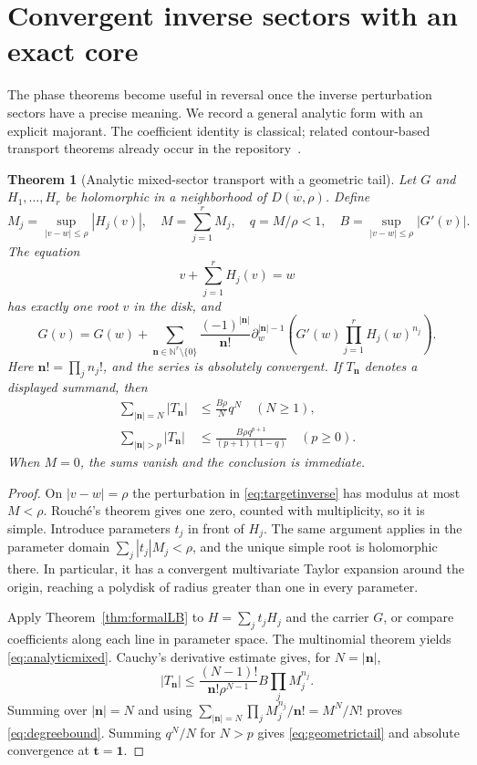 \documentclass[11pt,a4paper]{article}
\newtheorem{theorem}{Theorem}[section]
\theoremstyle{definition}
\theoremstyle{remark}
\newcommand{\N}{\mathbb N}
\newcommand{\nn}{\boldsymbol n}
\newcommand{\one}{\boldsymbol 1}
\numberwithin{equation}{section}
\begin{document}
\section{Convergent inverse sectors with an exact core}\label{sec:analytic}

The phase theorems become useful in reversal once the inverse perturbation sectors have a precise meaning. We record a general analytic form with an explicit majorant. The coefficient identity is classical; related contour-based transport theorems already occur in the repository~\cite{RepoStokes}.

\begin{theorem}[Analytic mixed-sector transport with a geometric tail]\label{thm:analyticLB}
Let $G$ and $H_1,\ldots,H_r$ be holomorphic in a neighborhood of $\overline{D(w,\rho)}$. Define
\[
 M_j=\sup_{|v-w|\le\rho}|H_j(v)|,\quad M=\sum_{j=1}^r M_j,
 \quad q=M/\rho<1,\quad B=\sup_{|v-w|\le\rho}|G'(v)|.
\]
The equation
\begin{equation}\label{eq:targetinverse}
 v+\sum_{j=1}^r H_j(v)=w
\end{equation}
has exactly one root $v$ in the disk, and
\begin{equation}\label{eq:analyticmixed}
 G(v)=G(w)+\sum_{\nn\in\N^r\setminus\{0\}}
 \frac{(-1)^{|\nn|}}{\nn!}
 \partial_w^{|\nn|-1}
 \left(G'(w)\prod_{j=1}^r H_j(w)^{n_j}\right).
\end{equation}
Here $\nn!=\prod_j n_j!$, and the series is absolutely convergent. If $T_{\nn}$ denotes a displayed summand, then
\begin{align}
 \sum_{|\nn|=N}|T_{\nn}|&\le\frac{B\rho}{N}q^N\quad(N\ge1),\label{eq:degreebound}\\
 \sum_{|\nn|>p}|T_{\nn}|&\le
 \frac{B\rho q^{p+1}}{(p+1)(1-q)}\quad(p\ge0).
 \label{eq:geometrictail}
\end{align}
When $M=0$, the sums vanish and the conclusion is immediate.
\end{theorem}
\begin{proof}
On $|v-w|=\rho$ the perturbation in \eqref{eq:targetinverse} has modulus at most $M<\rho$. Rouch\'e's theorem gives one zero, counted with multiplicity, so it is simple. Introduce parameters $t_j$ in front of $H_j$. The same argument applies in the parameter domain $\sum_j|t_j|M_j<\rho$, and the unique simple root is holomorphic there. In particular, it has a convergent multivariate Taylor expansion around the origin, reaching a polydisk of radius greater than one in every parameter.

Apply Theorem~\ref{thm:formalLB} to $H=\sum_j t_jH_j$ and the carrier $G$, or compare coefficients along each line in parameter space. The multinomial theorem yields \eqref{eq:analyticmixed}. Cauchy's derivative estimate gives, for $N=|\nn|$,
\[
 |T_{\nn}|\le
 \frac{(N-1)!}{\nn!\rho^{N-1}}
 B\prod_j M_j^{n_j}.
\]
Summing over $|\nn|=N$ and using
$\sum_{|\nn|=N}\prod_jM_j^{n_j}/\nn!=M^N/N!$
proves \eqref{eq:degreebound}. Summing $q^N/N$ for $N>p$ gives \eqref{eq:geometrictail} and absolute convergence at $\boldsymbol t=\one$.
\end{proof}
\end{document}
